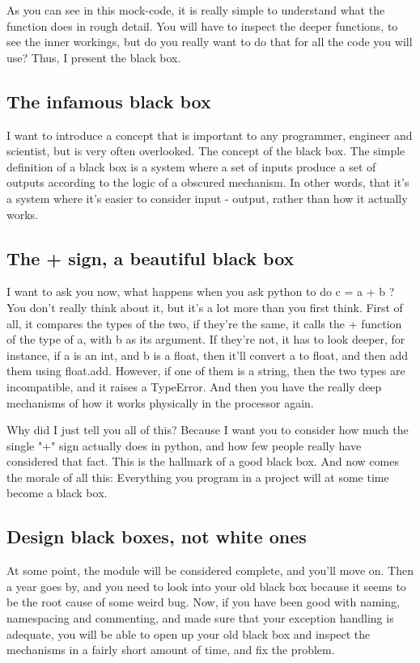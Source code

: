 \documentclass[10pt,a4paper]{article}
\begin{document}
As you can see in this mock-code, it is really simple to understand what the function does in rough detail. You will have to inspect the deeper functions, to see the inner workings, but do you really want to do that for all the code you will use? Thus, I present the black box.

\subsection{The infamous black box}
I want to introduce a concept that is important to any programmer, engineer and scientist, but is very often overlooked. The concept of the black box. The simple definition of a black box is a system where a set of inputs produce a set of outputs according to the logic of a obscured mechanism. In other words, that it's a system where it's easier to consider input - output, rather than how it actually works. 

\subsection{The + sign, a beautiful black box}
I want to ask you now, what happens when you ask python to do c = a + b ? You don't really think about it, but it's a lot more than you first think. First of all, it compares the types of the two, if they're the same, it calls the + function of the type of a, with b as its argument. If they're not, it has to look deeper, for instance, if a is an int, and b is a float, then it'll convert a to float, and then add them using float.add. However, if one of them is a string, then the two types are incompatible, and it raises a TypeError. And then you have the really deep mechanisms of how it works physically in the processor again.

Why did I just tell you all of this? Because I want you to consider how much the single "+" sign actually does in python, and how few people really have considered that fact. This is the hallmark of a good black box. And now comes the morale of all this: Everything you program in a project will at some time become a black box. 

\subsection{Design black boxes, not white ones}
At some point, the module will be considered complete, and you'll move on. Then a year goes by, and you need to look into your old black box because it seems to be the root cause of some weird bug. Now, if you have been good with naming, namespacing and commenting, and made sure that your exception handling is adequate, you will be able to open up your old black box and inspect the mechanisms in a fairly short amount of time, and fix the problem. 
\end{document}
